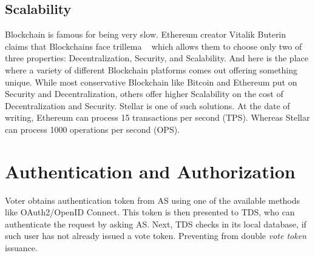 \documentclass[runningheads]{llncs}
\begin{document}
\subsection{Scalability}

Blockchain is famous for being very slow. Ethereum creator Vitalik Buterin claims that Blockchains face trillema ~\cite{ethereum} which allows them to choose only two of three properties: Decentralization, Security, and Scalability. And here is the place where a variety of different Blockchain platforms comes out offering something unique. While most conservative Blockchain like Bitcoin and Ethereum put on Security and Decentralization, others offer higher Scalability on the cost of Decentralization and Security. Stellar is one of such solutions. 
At the date of writing, Ethereum can process 15 transactions per second (TPS). Whereas Stellar can process 1000 operations per second (OPS). 

\section{Authentication and Authorization}
Voter obtains authentication token from AS using one of the available methods like OAuth2/OpenID Connect. This token is then presented to TDS, who can authenticate the request by asking AS. Next, TDS checks in its local database, if such user has not already issued a vote token. Preventing from double \textit{vote token} issuance.
\end{document}
